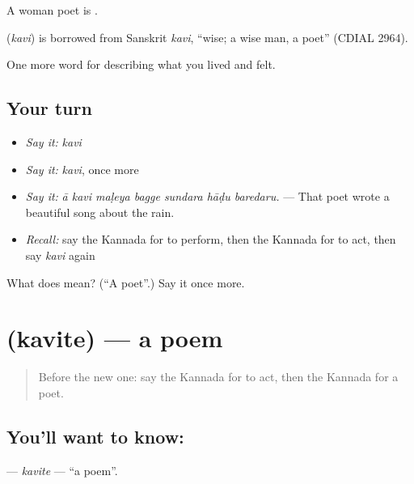 A woman poet is .

\begin{cousinweb}
\textbf{} (\emph{kavi}) is borrowed from Sanskrit \emph{kavi}, \textquotedblleft{}wise; a wise man, a poet\textquotedblright{} (CDIAL 2964).
\end{cousinweb}

\begin{grammarlens}[title={What you've built}]
One more word for describing what you lived and felt.
\end{grammarlens}

\subsection*{Your turn}
\begin{itemize}
\raggedright
  \item \emph{Say it:} \emph{kavi}
  \item \emph{Say it:} \emph{kavi}, once more
  \item \emph{Say it:} \emph{ā kavi maḷeya bagge sundara hāḍu baredaru.} — That poet wrote a beautiful song about the rain.
  \item \emph{Recall:} say the Kannada for to perform, then the Kannada for to act, then say \emph{kavi} again
\end{itemize}

\begin{tcolorbox}[breakable,colback=teal!4,colframe=teal!35!black,title={Before you move on}]
What does  mean? (\textquotedblleft{}A poet\textquotedblright{}.) Say it once more.
\end{tcolorbox}
\section[\texorpdfstring{\kn{ಕವಿತೆ} (kavite)}{ಕವಿತೆ (kavite)}]{ (kavite) — a poem}

\label{lesson:KA-C537-kavite}



\begin{quote}
Before the new one: say the Kannada for to act, then the Kannada for a poet.
\end{quote}

\subsection*{You'll want to know: }
\textbf{} — \emph{kavite} — \textquotedblleft{}a poem\textquotedblright{}.

